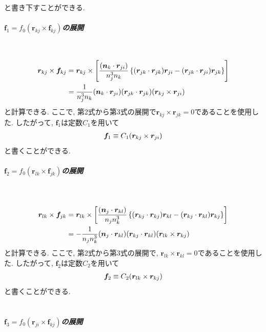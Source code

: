 と書き下すことができる. 
\\
\subparagraph{$\bm{f}_{1} = f_{0} (\bm{r}_{kj} \times \bm{f}_{kj})$の展開} \
\begin{align}
    \bm{r}_{kj} \times \bm{f}_{kj}
 &=
    \bm{r}_{kj} \times
    \left[
          \frac{(\bm{n}_{k} \cdot \bm{r}_{ji})}{n_{j}^{3}n_{k}}
          \left\{
                  (\bm{r}_{jk} \cdot \bm{r}_{jk}) \bm{r}_{ji}
                 -(\bm{r}_{jk} \cdot \bm{r}_{ji}) \bm{r}_{jk}
          \right\}
    \right]
 \notag
 \\
 &=
    \frac{1}{n_{j}^{3}n_{k}}
    (\bm{n}_{k} \cdot \bm{r}_{ji})
    (\bm{r}_{jk} \cdot \bm{r}_{jk})
    (\bm{r}_{kj} \times \bm{r}_{ji})
 \notag
\end{align}
と計算できる.
ここで, 第2式から第3式の展開で$\bm{r}_{kj} \times \bm{r}_{jk} = 0$であることを使用した.
したがって, $\bm{f}_{1}$は定数$C_{1}$を用いて
\begin{align}
 \bm{f}_{1} \equiv C_{1} (\bm{r}_{kj} \times \bm{r}_{ji})
 \notag
\end{align}
と書くことができる. 
\\

\subparagraph{$\bm{f}_{2} = f_{0} (\bm{r}_{lk} \times \bm{f}_{jk})$の展開} \

\begin{align}
    \bm{r}_{lk} \times \bm{f}_{jk}
 &=
    \bm{r}_{lk} \times
    \left[
          \frac{(\bm{n}_{j} \cdot \bm{r}_{kl})}{n_{j}n_{k}^{3}}
          \left\{
                  (\bm{r}_{kj} \cdot \bm{r}_{kj}) \bm{r}_{kl}
                 -(\bm{r}_{kj} \cdot \bm{r}_{kl}) \bm{r}_{kj}
          \right\}
    \right]
 \notag
 \\
 &=
    - \frac{1}{n_{j}n_{k}^{3}}
    (\bm{n}_{j} \cdot \bm{r}_{kl})
    (\bm{r}_{kj} \cdot \bm{r}_{kl})
    (\bm{r}_{lk} \times \bm{r}_{kj})
 \notag
\end{align}
と計算できる. ここで, 第2式から第3式の展開で, $\bm{r}_{lk} \times \bm{r}_{kl} = 0$であることを使用した. 
したがって, $\bm{f}_{2}$は定数$C_{2}$を用いて
\begin{align}
 \bm{f}_{2} \equiv C_{2} (\bm{r}_{lk} \times \bm{r}_{kj})
 \notag
\end{align}
と書くことができる. 
\\
\\

\subparagraph{$\bm{f}_{3} = f_{0} (\bm{r}_{ji} \times \bm{f}_{kj})$の展開} \

